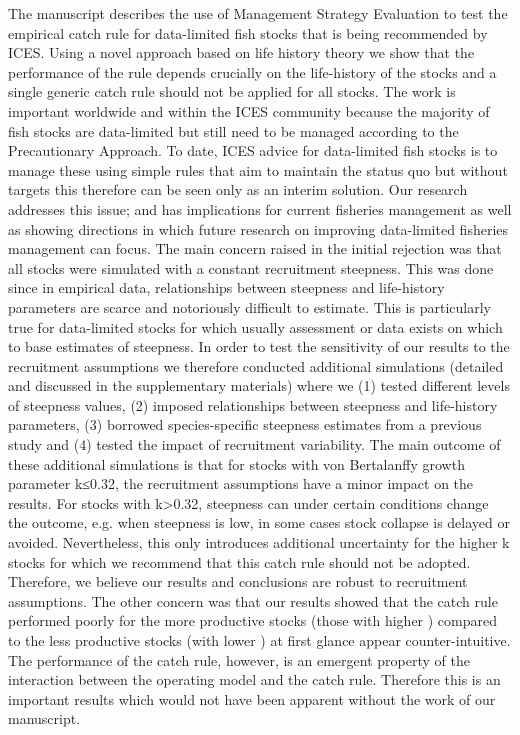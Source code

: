 The manuscript describes the use of Management Strategy Evaluation to test the empirical catch rule for data-limited fish stocks that is being recommended by ICES. Using a novel approach based on life history theory we  show that the performance of the rule depends crucially on the life-history of the stocks and a single generic catch rule should not be applied for all stocks. The work is important worldwide and within the ICES community because the majority of fish stocks are data-limited but still need to be managed according to the Precautionary Approach. To date, ICES advice for data-limited fish stocks is to manage these using simple rules that aim to maintain the status quo but without targets this therefore can be seen only as an interim solution. Our research  addresses this issue; and has implications for current fisheries management as well as showing directions in which future research on improving data-limited fisheries management can focus.
The main concern raised in the initial rejection was that all stocks were simulated with a constant recruitment steepness. This was done since in empirical data, relationships between steepness and life-history parameters are scarce and notoriously difficult to estimate. This is particularly true for data-limited stocks for which usually assessment or data exists on which to base estimates of steepness. In order to test the sensitivity of our results to the recruitment assumptions we therefore conducted additional simulations (detailed and discussed in the supplementary materials) where we (1) tested different levels of steepness values, (2) imposed relationships between steepness and life-history parameters, (3) borrowed species-specific steepness estimates from a previous study and (4) tested the impact of recruitment variability. 
The main outcome of these additional simulations is that for stocks with von Bertalanffy growth parameter k≤0.32, the recruitment assumptions have a minor impact on the results. For stocks with k>0.32, steepness can under certain conditions change the outcome, e.g. when steepness is low, in some cases stock collapse is delayed or avoided. Nevertheless, this only introduces additional uncertainty for the higher k stocks for which we recommend that this catch rule should not be adopted. Therefore, we believe our results and conclusions are robust to recruitment assumptions.
The other concern was that our results showed that the catch rule performed poorly for the more productive stocks (those with higher ) compared to the less productive stocks (with lower ) at first glance appear counter-intuitive. The performance of the catch rule, however, is an emergent property of the interaction between the operating model and the catch rule. Therefore this is an important results which would not have been apparent without the work of our manuscript.
